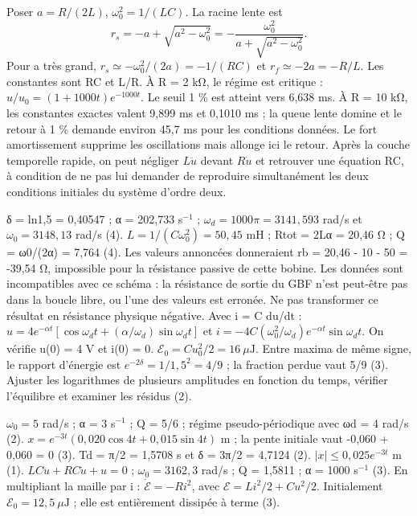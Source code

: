 Poser $a=R/(2L)$, $\omega_0^2=1/(LC)$. La racine lente est
\[r_s=-a+\sqrt{a^2-\omega_0^2}=-\frac{\omega_0^2}{a+\sqrt{a^2-\omega_0^2}}.\]
Pour a très grand, $r_s\simeq-\omega_0^2/(2a)=-1/(RC)$ et $r_f\simeq-2a=-R/L$. Les constantes sont RC et L/R.
À R = 2 kΩ, le régime est critique : $u/u_0=(1+1000t)e^{-1000t}$. Le seuil 1 \% est atteint vers 6,638 ms. À R = 10 kΩ, les constantes exactes valent 9,899 ms et 0,1010 ms ; la queue lente domine et le retour à 1 \% demande environ 45,7 ms pour les conditions données.
Le fort amortissement supprime les oscillations mais allonge ici le retour. Après la couche temporelle rapide, on peut négliger $L\ddot u$ devant $R\dot u$ et retrouver une équation RC, à condition de ne pas lui demander de reproduire simultanément les deux conditions initiales du système d’ordre deux.


δ = ln1,5 = 0,40547 ; α = 202,733 s$^{-1}$ ; $\omega_d=1000\pi=3141{,}593$ rad/s et $\omega_0=3148{,}13$ rad/s (4). $L=1/(C\omega_0^2)=50{,}45$ mH ; Rtot = 2Lα = 20,46 Ω ; Q = ω0/(2α) = 7,764 (4).
Les valeurs annoncées donneraient rb = 20,46 - 10 - 50 = -39,54 Ω, impossible pour la résistance passive de cette bobine. Les données sont incompatibles avec ce schéma : la résistance de sortie du GBF n’est peut-être pas dans la boucle libre, ou l’une des valeurs est erronée. Ne pas transformer ce résultat en résistance physique négative.
Avec i = C du/dt : $u=4e^{-\alpha t}[\cos\omega_dt+(\alpha/\omega_d)\sin\omega_dt]$ et $i=-4C(\omega_0^2/\omega_d)e^{-\alpha t}\sin\omega_dt$. On vérifie u(0) = 4 V et i(0) = 0.
$\mathcal E_0=Cu_0^2/2=16\ \mu\mathrm{ J}$. Entre maxima de même signe, le rapport d’énergie est $e^{-2\delta}=1/1{,}5^2=4/9$ ; la fraction perdue vaut 5/9 (3). Ajuster les logarithmes de plusieurs amplitudes en fonction du temps, vérifier l’équilibre et examiner les résidus (2).


$\omega_0=5$ rad/s ; α = 3 s$^{-1}$ ; Q = 5/6 ; régime pseudo-périodique avec ωd = 4 rad/s (2). $x=e^{-3t}(0{,}020\cos4t+0{,}015\sin4t)$ m ; la pente initiale vaut -0,060 + 0,060 = 0 (3). Td = π/2 = 1,5708 s et δ = 3π/2 = 4,7124 (2). $|x|\leq0{,}025e^{-3t}$ m (1).
$LC\ddot u+RC\dot u+u=0$ ; $\omega_0=3162{,}3$ rad/s ; Q = 1,5811 ; α = 1000 s$^{-1}$ (3). En multipliant la maille par i : $\dot{\mathcal E}=-Ri^2$, avec $\mathcal E=Li^2/2+Cu^2/2$. Initialement $\mathcal E_0=12{,}5\ \mu\mathrm{ J}$ ; elle est entièrement dissipée à terme (3).


